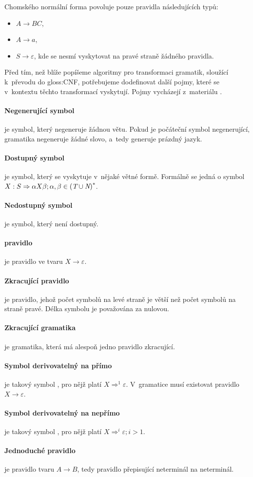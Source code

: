 		Chomského normální forma povoluje pouze pravidla následujících typů:
		\begin{itemize}
			\item $A \rightarrow B C$,
			\item $A \rightarrow a$,
			\item $S \rightarrow \varepsilon$, kde  se nesmí vyskytovat na pravé straně žádného pravidla.
		\end{itemize}
	
		Před tím, než blíže popíšeme algoritmy pro transformaci gramatik, sloužící k~převodu do \gls{gloss:CNF}, potřebujeme dodefinovat další pojmy, které se v~kontextu těchto transformací vyskytují. Pojmy vycházejí z~materiálu \cite{Meduna:2014:FLC:2636678}.
		
		\paragraph{Negenerující symbol}
		je symbol, který negeneruje žádnou větu. Pokud je počáteční symbol  negenerující, gramatika negeneruje žádné slovo, a~tedy generuje prázdný jazyk.
		\paragraph{Dostupný symbol}
		je symbol, který se vyskytuje v~nějaké větné formě. Formálně se jedná o symbol $X: S \Rightarrow\alpha X \beta; \alpha,\beta\in{(\textit{T}\cup\textit{N})}^{\ast}$.
		\paragraph{Nedostupný symbol}
		je symbol, který není dostupný.
		\paragraph{\EpsS pravidlo}
		je pravidlo ve tvaru $X\rightarrow\varepsilon$.
		\paragraph{Zkracující pravidlo}
		je pravidlo, jehož počet symbolů na levé straně je větší než počet symbolů na straně pravé. Délka \EpsS symbolu je považována za nulovou.
		\paragraph{Zkracující gramatika}
		je gramatika, která má alespoň jedno pravidlo zkracující.
		\paragraph{Symbol derivovatelný na \EpsS přímo}
		je takový symbol , pro nějž platí $X{\Rightarrow}^{1}\varepsilon$. V~gramatice musí existovat pravidlo $X\rightarrow\varepsilon$.
		\paragraph{Symbol derivovatelný na \EpsS nepřímo}
		je takový symbol , pro nějž platí $X{\Rightarrow}^{i}\varepsilon;i>1$.
		\paragraph{Jednoduché pravidlo}
		je pravidlo tvaru $A \rightarrow B$, tedy pravidlo přepisující neterminál na neterminál.
		
		
		
	
